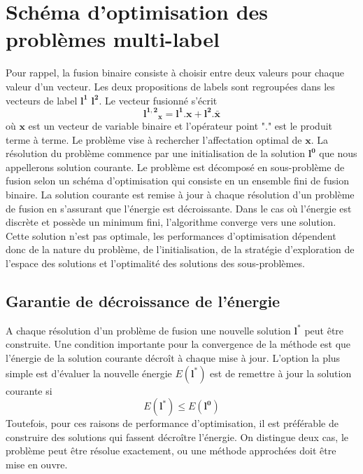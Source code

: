\documentclass[../main/These_Mathias_Paget.tex]{subfiles}
\begin{document}
\section{Schéma d'optimisation des problèmes multi-label}
	Pour rappel, la fusion binaire consiste à choisir entre deux valeurs pour chaque valeur d'un vecteur. Les deux propositions de labels sont regroupées dans les vecteurs de label $\boldsymbol{l^1}$ $\boldsymbol{l^2}$. Le vecteur fusionné s'écrit
\begin{equation}
		\boldsymbol{l^{1,2}}_{\boldsymbol{x}} = \boldsymbol{l^1}.\boldsymbol{x} + \boldsymbol{l^2}.\boldsymbol{\bar{x}}
\end{equation}
	où $\boldsymbol{x}$ est un vecteur de variable binaire et l'opérateur point "$.$" est le produit terme à terme. Le problème vise à rechercher l'affectation optimal de $\boldsymbol{x}$. La résolution du problème commence par une initialisation de la solution $\boldsymbol{l^0}$ que nous appellerons solution courante. Le problème est décomposé en sous-problème de fusion selon un schéma d'optimisation qui consiste en un ensemble fini de fusion binaire. La solution courante est remise à jour à chaque résolution d'un problème de fusion en s'assurant que l’énergie est décroissante. Dans le cas où l’énergie est discrète et possède un minimum fini, l'algorithme converge vers une solution. Cette solution n'est pas optimale, les performances d'optimisation dépendent donc de la nature du problème, de l'initialisation, de la stratégie d'exploration de l'espace des solutions et l'optimalité des solutions des sous-problèmes.

\subsection{Garantie de décroissance de l’énergie}

A chaque résolution d'un problème de fusion une nouvelle solution $\boldsymbol{l^*}$ peut être construite. Une condition importante pour la convergence de la méthode est que l’énergie de la solution courante décroît à chaque mise à jour. L'option la plus simple est d'évaluer la nouvelle énergie $E(\boldsymbol{l^*})$ est de remettre à jour la solution courante si
\begin{equation}
		  E(\boldsymbol{l^*}) \leq E(\boldsymbol{l^0})
\end{equation}
Toutefois, pour ces raisons de performance d'optimisation, il est préférable de construire des solutions qui fassent décroître l’énergie. On distingue deux cas, le problème peut être résolue exactement, ou une méthode approchées doit être mise en ouvre.
\end{document}
